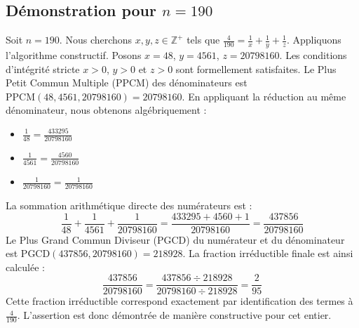 \documentclass[11pt,a4paper]{article}
\begin{document}
\subsection{Démonstration pour $n = 190$}
Soit $n = 190$. Nous cherchons $x, y, z \in \mathbb{Z}^{+}$ tels que $\frac{4}{190} = \frac{1}{x} + \frac{1}{y} + \frac{1}{z}$.
Appliquons l'algorithme constructif. Posons $x = 48$, $y = 4561$, $z = 20798160$.
Les conditions d'intégrité stricte $x > 0$, $y > 0$ et $z > 0$ sont formellement satisfaites.
Le Plus Petit Commun Multiple (PPCM) des dénominateurs est $\text{PPCM}(48, 4561, 20798160) = 20798160$.
En appliquant la réduction au même dénominateur, nous obtenons algébriquement :
\begin{itemize}
    \item $\frac{1}{48} = \frac{433295}{20798160}$
    \item $\frac{1}{4561} = \frac{4560}{20798160}$
    \item $\frac{1}{20798160} = \frac{1}{20798160}$
\end{itemize}
La sommation arithmétique directe des numérateurs est :
$$ \frac{1}{48} + \frac{1}{4561} + \frac{1}{20798160} = \frac{433295 + 4560 + 1}{20798160} = \frac{437856}{20798160} $$
Le Plus Grand Commun Diviseur (PGCD) du numérateur et du dénominateur est $\text{PGCD}(437856, 20798160) = 218928$.
La fraction irréductible finale est ainsi calculée :
$$ \frac{437856}{20798160} = \frac{437856 \div 218928}{20798160 \div 218928} = \frac{2}{95} $$
Cette fraction irréductible correspond exactement par identification des termes à $\frac{4}{190}$. L'assertion est donc démontrée de manière constructive pour cet entier.
\end{document}
